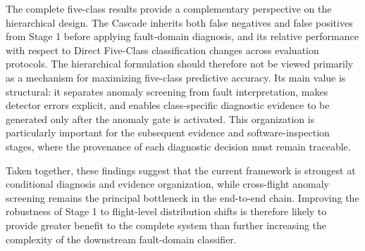 The complete five-class results provide a complementary perspective on the hierarchical design. The Cascade inherits both false negatives and false positives from Stage 1 before applying fault-domain diagnosis, and its relative performance with respect to Direct Five-Class classification changes across evaluation protocols. The hierarchical formulation should therefore not be viewed primarily as a mechanism for maximizing five-class predictive accuracy. Its main value is structural: it separates anomaly screening from fault interpretation, makes detector errors explicit, and enables class-specific diagnostic evidence to be generated only after the anomaly gate is activated. This organization is particularly important for the subsequent evidence and software-inspection stages, where the provenance of each diagnostic decision must remain traceable.

Taken together, these findings suggest that the current framework is strongest at conditional diagnosis and evidence organization, while cross-flight anomaly screening remains the principal bottleneck in the end-to-end chain. Improving the robustness of Stage 1 to flight-level distribution shifts is therefore likely to provide greater benefit to the complete system than further increasing the complexity of the downstream fault-domain classifier.
